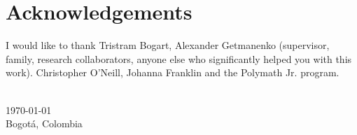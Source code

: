 \chapter*{Acknowledgements}

I would like to thank Tristram Bogart, Alexander Getmanenko (supervisor, family, research collaborators, anyone else who significantly helped you with this work). Christopher O'Neill, Johanna Franklin and the Polymath Jr. program.

{
\makeatletter
\vspace{1cm}
\raggedleft
\@author{}\\
\today{}\\
Bogotá, Colombia\\
\raggedright
\makeatother
}

